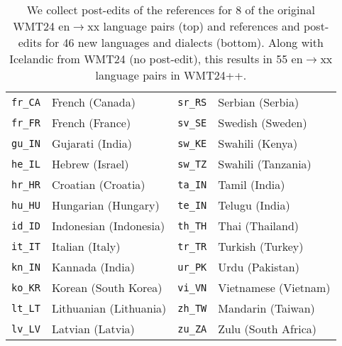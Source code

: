 \begin{table}[t!]
\begin{adjustbox}{width=\columnwidth}
\begin{tabular}{ll|ll}
\texttt{fr\_CA} & French (Canada) & \texttt{sr\_RS} & Serbian (Serbia) \\
\texttt{fr\_FR} & French (France) & \texttt{sv\_SE} & Swedish (Sweden) \\
\texttt{gu\_IN} & Gujarati (India) & \texttt{sw\_KE} & Swahili (Kenya) \\
\texttt{he\_IL} & Hebrew (Israel) & \texttt{sw\_TZ} & Swahili (Tanzania) \\
\texttt{hr\_HR} & Croatian (Croatia) & \texttt{ta\_IN} & Tamil (India) \\
\texttt{hu\_HU} & Hungarian (Hungary) & \texttt{te\_IN} & Telugu (India) \\
\texttt{id\_ID} & Indonesian (Indonesia) & \texttt{th\_TH} & Thai (Thailand) \\
\texttt{it\_IT} & Italian (Italy) & \texttt{tr\_TR} & Turkish (Turkey) \\
\texttt{kn\_IN} & Kannada (India) & \texttt{ur\_PK} & Urdu (Pakistan) \\
\texttt{ko\_KR} & Korean (South Korea) & \texttt{vi\_VN} & Vietnamese (Vietnam) \\
\texttt{lt\_LT} & Lithuanian (Lithuania) & \texttt{zh\_TW} & Mandarin (Taiwan) \\
\texttt{lv\_LV} & Latvian (Latvia) & \texttt{zu\_ZA} & Zulu (South Africa) \\

\bottomrule
    \end{tabular}
    \end{adjustbox}
    \caption{We collect post-edits of the references for 8 of the original WMT24 en$\rightarrow$xx language pairs (top) and references and post-edits for 46 new languages and dialects (bottom).
    Along with Icelandic from WMT24 (no post-edit), this results in 55 en$\rightarrow$xx language pairs in WMT24++.}
    \label{tab:languages}
\end{table}